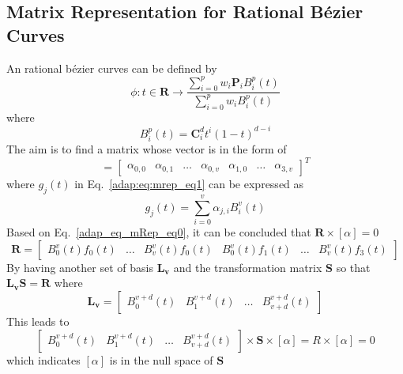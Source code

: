\subsection{Matrix Representation for Rational Bézier Curves}
An rational bézier curves can be defined by 
\begin{equation}
	\phi:t\in \mathbf{R}\rightarrow \frac{\sum_{i=0}^pw_i\mathbf{P}_iB_i^p(t) }{\sum_{i=0}^pw_iB_i^p(t)}
\end{equation}
where
\begin{equation}
    B_i^p(t) = \mathbf{C}_i^dt^i(1-t)^{d-i}
    \label{adap_eq_mrep_bbasis}
\end{equation}
%
The aim is to find a matrix whose vector is in the form of
\begin{equation}
    [\alpha] =
    \begin{bmatrix}
        \alpha_{0,0} & \alpha_{0,1}&  \dots&  \alpha_{0,v} & \alpha_{1,0} & \dots & \alpha_{3,v} 
    \end{bmatrix}^T
\end{equation}
%
where $g_j(t)$ in Eq.~\ref{adap:eq:mrep_eq1} can be expressed as
\begin{equation}
    g_j(t) = \sum_{i=0}^v \alpha_{j,i}B_i^v(t)
\end{equation}
%
Based on Eq.~\eqref{adap_eq_mRep_eq0}, it can be concluded that $\mathbf{R}\times\left[\alpha\right]=0$
\begin{equation}
    \mathbf{R} = 
    \begin{bmatrix}
        B_0^v(t)f_0(t) & \dots & B_v^v(t)f_0(t) & B_0^v(t)f_1(t) & \dots & B_v^v(t)f_3(t)
    \end{bmatrix}
\end{equation}
%
By having another set of basis $\mathbf{L_v}$ and the transformation matrix $\mathbf{S}$ so that $\mathbf{L_vS}=\mathbf{R}$ where
\begin{equation}
    \mathbf{L_v}=
    \begin{bmatrix}
        B_0^{v+d}(t) & B_1^{v+d}(t) & \dots & B_{v+d}^{v+d}(t)
    \end{bmatrix}
\end{equation}
%
This leads to
\begin{equation}
    \begin{bmatrix}
        B_0^{v+d}(t) & B_1^{v+d}(t) & \dots & B_{v+d}^{v+d}(t)
    \end{bmatrix}\times \mathbf{S}\times\left[\alpha\right] = R\times\left[\alpha\right] = 0
\end{equation}
which indicates $\left[ \alpha\right]$ is in the null space of $\mathbf{S}$

